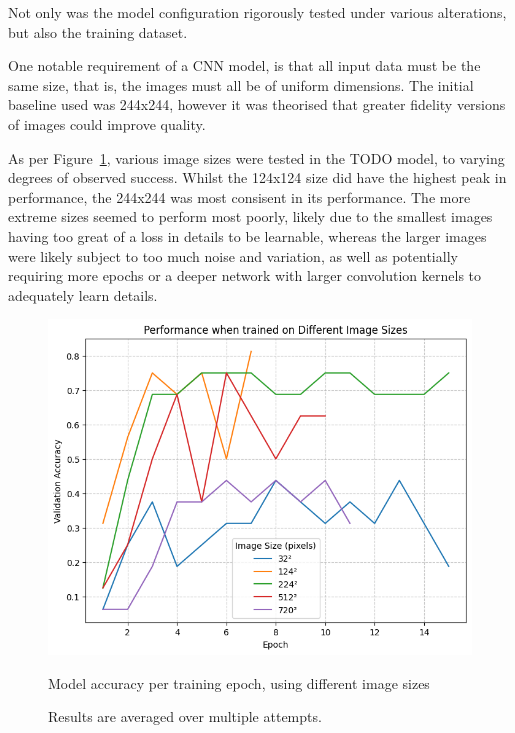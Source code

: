                         Not only was the model configuration rigorously tested under various alterations, but also the training dataset.
    
                        One notable requirement of a CNN model, is that all input data must be the same size, that is, the images must all be of uniform dimensions. The initial baseline used was 244x244, however it was theorised that greater fidelity versions of images could improve quality.
    
                        As per Figure~\ref{fig:CNNSize_Perf}, various image sizes were tested in the TODO model, to varying degrees of observed success. Whilst the 124x124 size did have the highest peak in performance, the 244x244 was most consisent in its performance. The more extreme sizes seemed to perform most poorly, likely due to the smallest images having too great of a loss in details to be learnable, whereas the larger images were likely subject to too much noise and variation, as well as potentially requiring more epochs or a deeper network with larger convolution kernels to adequately learn details.
            
                        \begin{figure}[h]
                            \centering
                            \includegraphics[width=\textwidth]{images/CNNSize_Perf.png}
                            \caption{Model accuracy per training epoch, using different image sizes}
                            \label{fig:CNNSize_Perf}
                            \caption*{Results are averaged over multiple attempts.}
                        \end{figure}
    
